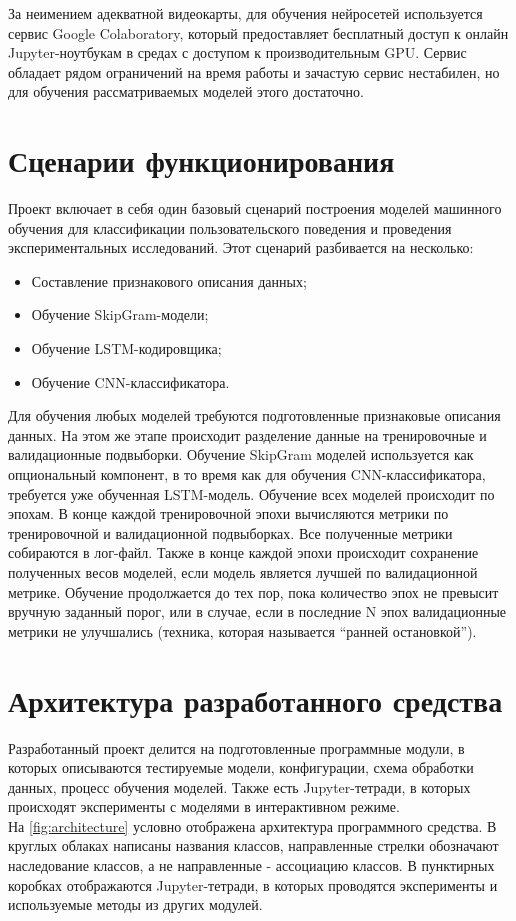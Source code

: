 За неимением адекватной видеокарты, для обучения нейросетей используется сервис Google Colaboratory, который предоставляет бесплатный доступ к онлайн Jupyter-ноутбукам в средах с доступом к производительным GPU. Сервис обладает рядом ограничений на время работы и зачастую сервис нестабилен, но для обучения рассматриваемых моделей этого достаточно.

\section{Сценарии функционирования}

Проект включает в себя один базовый сценарий построения моделей машинного обучения для классификации пользовательского поведения и проведения экспериментальных исследований. Этот сценарий разбивается на несколько:
\begin{itemize}
	\item Составление признакового описания данных;
	\item Обучение SkipGram-модели;
	\item Обучение LSTM-кодировщика;
	\item Обучение CNN-классификатора.
\end{itemize}


Для обучения любых моделей требуются подготовленные признаковые описания данных. На этом же этапе происходит разделение данные на тренировочные и валидационные подвыборки. Обучение SkipGram моделей используется как опциональный компонент, в то время как для обучения CNN-классификатора, требуется уже обученная LSTM-модель. Обучение всех моделей происходит по эпохам. В конце каждой тренировочной эпохи вычисляются метрики по тренировочной и валидационной подвыборках. Все полученные метрики собираются в лог-файл. Также в конце каждой эпохи происходит сохранение полученных весов моделей, если модель является лучшей по валидационной метрике. Обучение продолжается до тех пор, пока количество эпох не превысит вручную заданный порог, или в случае, если в последние N эпох валидационные метрики не улучшались (техника, которая называется ``ранней остановкой'').

\section{Архитектура разработанного средства}

Разработанный проект делится на подготовленные программные модули, в которых описываются тестируемые модели, конфигурации, схема обработки данных, процесс обучения моделей. Также есть Jupyter-тетради, в которых происходят эксперименты с моделями в интерактивном режиме.\\
На \autoref{fig:architecture} условно отображена архитектура программного средства. В круглых облаках написаны названия классов, направленные стрелки обозначают наследование классов, а не направленные - ассоциацию классов. В пунктирных коробках отображаются Jupyter-тетради, в которых проводятся эксперименты и используемые методы из других модулей.

